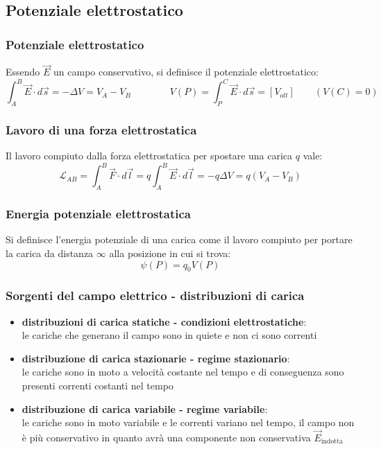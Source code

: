 \documentclass[a4paper]{article}
\begin{document}
\subsection{Potenziale elettrostatico}
\subsubsection*{Potenziale elettrostatico}
Essendo \(\vec{E}\) un campo conservativo, si definisce il potenziale elettrostatico:
\[\int_A^B \vec{E} \cdot d \vec{s} = -\Delta V = V_A - V_B \qquad \qquad V(P) = \int_P^C \vec{E} \cdot d \vec{s} = [V_{olt}] \qquad (V(C) = 0)\]

\subsubsection*{Lavoro di una forza elettrostatica}
Il lavoro compiuto dalla forza elettrostatica per spostare una carica \(q\) vale:
\[\mathcal{L}_{AB} = \int_A^B \vec{F} \cdot d \vec{l} = q \int_A^B \vec{E} \cdot d \vec{l} = - q \Delta V = q(V_A - V_B)\]

\subsubsection*{Energia potenziale elettrostatica}
Si definisce l'energia potenziale di una carica come il lavoro compiuto per portare la carica da distanza \(\infty\) alla posizione
in cui si trova: \[\psi(P) = q_0 V(P)\]

\subsubsection*{Sorgenti del campo elettrico - distribuzioni di carica}
\begin{itemize}
	\item \textbf{distribuzioni di carica statiche - condizioni elettrostatiche}: \\
	le cariche che generano il campo sono in quiete e non ci sono correnti
	\item \textbf{distribuzione di carica stazionarie - regime stazionario}: \\
	le cariche sono in moto a velocità costante nel tempo e di conseguenza sono presenti correnti costanti nel tempo
	\item \textbf{distribuzione di carica variabile - regime variabile}: \\
	le cariche sono in moto variabile e le correnti variano nel tempo, il campo non è più conservativo in quanto avrà una componente
	non conservativa \(\vec{E}_\text{indotta}\)
\end{itemize}
\end{document}
